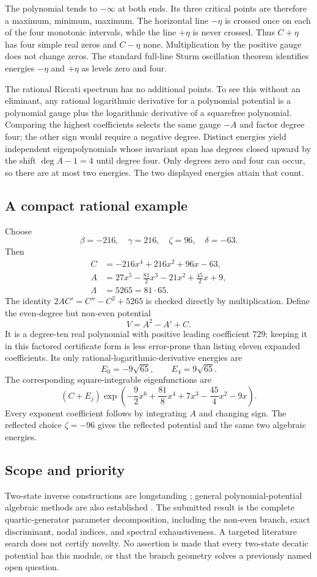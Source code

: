 \documentclass[11pt,a4paper]{article}
\theoremstyle{definition}\newtheorem{definition}[theorem]{Definition}
\theoremstyle{remark}\newtheorem{remark}[theorem]{Remark}
\numberwithin{equation}{section}
\begin{document}
The polynomial tends to $-\infty$ at both ends. Its three critical points are therefore a maximum, minimum, maximum. The horizontal line $-\eta$ is crossed once on each of the four monotonic intervals, while the line $+\eta$ is never crossed. Thus $C+\eta$ has four simple real zeros and $C-\eta$ none. Multiplication by the positive gauge does not change zeros. The standard full-line Sturm oscillation theorem identifies energies $-\eta$ and $+\eta$ as levels zero and four.

The rational Riccati spectrum has no additional points. To see this without an eliminant, any rational logarithmic derivative for a polynomial potential is a polynomial gauge plus the logarithmic derivative of a squarefree polynomial. Comparing the highest coefficients selects the same gauge $-A$ and factor degree four; the other sign would require a negative degree. Distinct energies yield independent eigenpolynomials whose invariant span has degrees closed upward by the shift $\deg A-1=4$ until degree four. Only degrees zero and four can occur, so there are at most two energies. The two displayed energies attain that count.
\subsection{A compact rational example}\label{H07-sec-5}
Choose
\[\beta=-216,\quad\gamma=216,\quad\zeta=96,\quad\delta=-63.
\]
Then
\begin{align*}
C&=-216x^4+216x^2+96x-63,\\
A&=27x^5-\frac{81}{2}x^3-21x^2+\frac{45}{2}x+9,\\
\Lambda&=5265=81\cdot65.
\end{align*}
The identity $2AC'=C''-C^2+5265$ is checked directly by multiplication. Define the even-degree but non-even potential
\[V=A^2-A'+C.
\]
It is a degree-ten real polynomial with positive leading coefficient $729$; keeping it in this factored certificate form is less error-prone than listing eleven expanded coefficients. Its only rational-logarithmic-derivative energies are
\[E_0=-9\sqrt{65},\qquad E_4=9\sqrt{65}.
\]
The corresponding square-integrable eigenfunctions are
\[(C+E_j)\exp\left(-\frac92x^6+\frac{81}{8}x^4+7x^3-\frac{45}{4}x^2-9x\right).
\]
Every exponent coefficient follows by integrating $A$ and changing sign. The reflected choice $\zeta=-96$ gives the reflected potential and the same two algebraic energies.
\subsection{Scope and priority}\label{H07-sec-6}
Two-state inverse constructions are longstanding \cite{ref087}; general polynomial-potential algebraic methods are also established \cite{ref080,ref086}. The submitted result is the complete quartic-generator parameter decomposition, including the non-even branch, exact discriminant, nodal indices, and spectral exhaustiveness. A targeted literature search does not certify novelty. No assertion is made that every two-state decatic potential has this module, or that the branch geometry solves a previously named open question.
\end{document}
